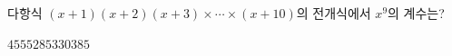 다항식 $(x+1)(x+2)(x+3)\times\cdots\times(x+10)$의 전개식에서 $x^9$의 계수는?
\begin{choices32}{$45$}{$55$}{$285$}{$330$}{$385$}\end{choices32}
